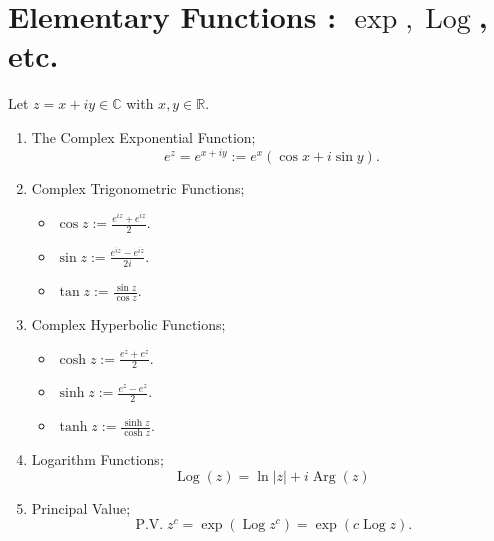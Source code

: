 \documentclass[12pt,openany]{book}
\theoremstyle{definition}
\newcommand{\R}{\mathbb{R}}
\newcommand{\C}{\mathbb{C}}
\newcommand{\of}[1]{\left( #1 \right)}
\newcommand{\abs}[1]{\left\lvert #1 \right\rvert}
\newcommand{\Log}{\operatorname{Log}}
\newcommand{\Arg}{\operatorname{Arg}}
\newcommand{\pv}{\operatorname{P.V.}}
\begin{document}
	\newpage
	\section{Elementary Functions : $\exp, \Log$, etc.}
	\begin{tcolorbox}[colback=white,colframe=magenta,arc=5pt,title={\color{white}\bf Summary}]
		Let $z=x+iy\in\C$ with $x,y\in\R$. \begin{enumerate}[(1)]
			\item The Complex Exponential Function; \[
			e^z=e^{x+iy}:=e^x\of{\cos x+i\sin y}.
			\]
			\item Complex Trigonometric Functions; \begin{itemize}
				\item $\displaystyle\cos z:=\frac{e^{iz}+e^{iz}}{2}$.
				\item $\displaystyle\sin z:=\frac{e^{iz}-e^{iz}}{2i}$.
				\item $\displaystyle\tan z:=\frac{\sin z}{\cos z}$.
			\end{itemize}
			\item Complex Hyperbolic Functions; \begin{itemize}
				\item $\displaystyle\cosh z:=\frac{e^{z}+e^{z}}{2}$.
				\item $\displaystyle\sinh z:=\frac{e^{z}-e^{z}}{2}$.
				\item $\displaystyle\tanh z:=\frac{\sinh z}{\cosh z}$.
			\end{itemize}
			\item Logarithm Functions; \[
			\Log(z)=\ln\abs{z}+i\Arg(z)
			\]
			\item Principal Value; \[
			\pv z^c=\exp(\Log z^c)=\exp\of{c\Log z}.
			\]
		\end{enumerate}
	\end{tcolorbox}
	
	\newpage
\end{document}
